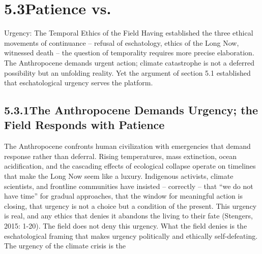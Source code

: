 \section{5.3\quad Patience vs.}

Urgency: The Temporal Ethics of the Field Having established the three ethical movements of continuance – refusal of eschatology, ethics of the Long Now, witnessed death – the question of temporality requires more precise elaboration. The Anthropocene demands urgent action; climate catastrophe is not a deferred possibility but an unfolding reality. Yet the argument of section 5.1 established that eschatological urgency serves the platform.

\subsection{5.3.1\quad The Anthropocene Demands Urgency; the Field Responds with Patience}

The Anthropocene confronts human civilization with emergencies that demand response rather than deferral. Rising temperatures, mass extinction, ocean acidification, and the cascading effects of ecological collapse operate on timelines that make the Long Now seem like a luxury. Indigenous activists, climate scientists, and frontline communities have insisted – correctly – that “we do not have time” for gradual approaches, that the window for meaningful action is closing, that urgency is not a choice but a condition of the present. This urgency is real, and any ethics that denies it abandons the living to their fate (Stengers, 2015: 1-20). The field does not deny this urgency. What the field denies is the eschatological framing that makes urgency politically and ethically self-defeating. The urgency of the climate crisis is the

